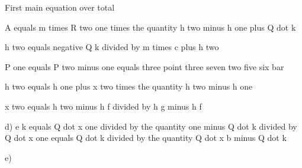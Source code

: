 First main equation over total

A equals m times R two one times the quantity h two minus h one plus Q dot k

h two equals negative Q k divided by m times c plus h two

P one equals P two minus one equals three point three seven two five six bar

h two equals h one plus x two times the quantity h two minus h one

x two equals h two minus h f divided by h g minus h f

d) e k equals Q dot x one divided by the quantity one minus Q dot k divided by Q dot x one equals Q dot k divided by the quantity Q dot x b minus Q dot k

e)